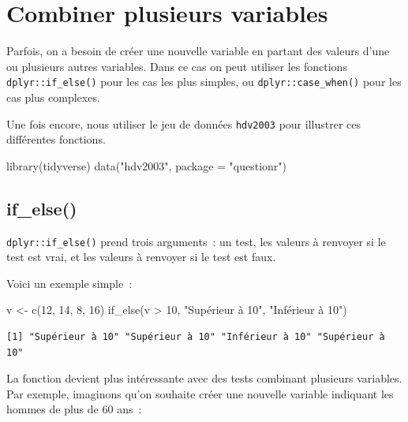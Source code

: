 \documentclass[
  letterpaper,
  DIV=11,
  numbers=noendperiod,
  oneside]{scrreprt}
\newenvironment{Shaded}{\begin{snugshade}}{\end{snugshade}}
\newcommand{\AttributeTok}[1]{\textcolor[rgb]{0.40,0.45,0.13}{#1}}
\newcommand{\DecValTok}[1]{\textcolor[rgb]{0.68,0.00,0.00}{#1}}
\newcommand{\FunctionTok}[1]{\textcolor[rgb]{0.28,0.35,0.67}{#1}}
\newcommand{\NormalTok}[1]{\textcolor[rgb]{0.00,0.23,0.31}{#1}}
\newcommand{\OtherTok}[1]{\textcolor[rgb]{0.00,0.23,0.31}{#1}}
\newcommand{\SpecialCharTok}[1]{\textcolor[rgb]{0.37,0.37,0.37}{#1}}
\newcommand{\StringTok}[1]{\textcolor[rgb]{0.13,0.47,0.30}{#1}}
\begin{document}
\hypertarget{sec-combiner-variables}{%
\chapter{Combiner plusieurs variables}\label{sec-combiner-variables}}

Parfois, on a besoin de créer une nouvelle variable en partant des
valeurs d'une ou plusieurs autres variables. Dans ce cas on peut
utiliser les fonctions \texttt{dplyr::if\_else()} pour les cas les plus
simples, ou \texttt{dplyr::case\_when()} pour les cas plus complexes.

Une fois encore, nous utiliser le jeu de données \texttt{hdv2003} pour
illustrer ces différentes fonctions.

\begin{Shaded}
\begin{Highlighting}[]
\FunctionTok{library}\NormalTok{(tidyverse)}
\FunctionTok{data}\NormalTok{(}\StringTok{"hdv2003"}\NormalTok{, }\AttributeTok{package =} \StringTok{"questionr"}\NormalTok{)}
\end{Highlighting}
\end{Shaded}

\hypertarget{if_else}{%
\section{if\_else()}\label{if_else}}

\texttt{dplyr::if\_else()} prend trois arguments~: un test, les valeurs
à renvoyer si le test est vrai, et les valeurs à renvoyer si le test est
faux.

Voici un exemple simple~:

\begin{Shaded}
\begin{Highlighting}[]
\NormalTok{v }\OtherTok{\textless{}{-}} \FunctionTok{c}\NormalTok{(}\DecValTok{12}\NormalTok{, }\DecValTok{14}\NormalTok{, }\DecValTok{8}\NormalTok{, }\DecValTok{16}\NormalTok{)}
\FunctionTok{if\_else}\NormalTok{(v }\SpecialCharTok{\textgreater{}} \DecValTok{10}\NormalTok{, }\StringTok{"Supérieur à 10"}\NormalTok{, }\StringTok{"Inférieur à 10"}\NormalTok{)}
\end{Highlighting}
\end{Shaded}

\begin{verbatim}
[1] "Supérieur à 10" "Supérieur à 10" "Inférieur à 10" "Supérieur à 10"
\end{verbatim}

La fonction devient plus intéressante avec des tests combinant plusieurs
variables. Par exemple, imaginons qu'on souhaite créer une nouvelle
variable indiquant les hommes de plus de 60 ans~:
\end{document}
